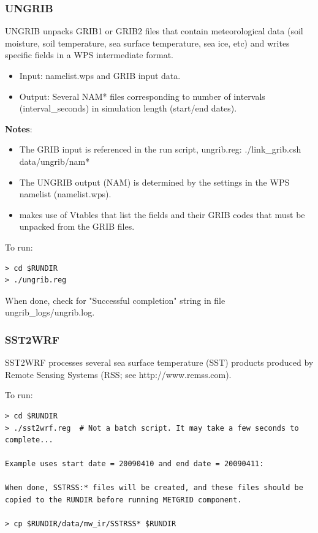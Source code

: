 \begin{frame}[fragile]\frametitle{UNGRIB}

\scriptsize{
UNGRIB unpacks GRIB1 or GRIB2 files that contain  meteorological data (soil moisture, soil temperature, sea surface temperature, sea ice, etc) and writes specific fields in a WPS intermediate format.
\begin{itemize}
\item Input: namelist.wps  and GRIB input data.
\item Output: Several NAM* files corresponding to number of intervals (interval\_seconds) in simulation length (start/end dates).
\end{itemize}}
\scriptsize{\textbf{Notes}: 
\begin{itemize}
\item The GRIB input is referenced in the run script, ungrib.reg:
      ./link\_grib.csh data/ungrib/nam*\\
\item The UNGRIB output (NAM) is determined by the settings in the WPS namelist (namelist.wps).
\item makes use of Vtables that list the fields and their GRIB codes that must be unpacked from the GRIB files.
\end{itemize}
}
\hrulefill\par
\scriptsize{To run:}
\verbatimfont{\scriptsize}%
\begin{verbatim}
> cd $RUNDIR
> ./ungrib.reg
\end{verbatim}
When done, check for "Successful completion" string in file ungrib\_logs/ungrib.log.

\end{frame}

\begin{frame}[fragile]
\frametitle{SST2WRF}

\footnotesize{
SST2WRF processes several sea surface temperature (SST) products produced by Remote Sensing Systems (RSS; see http://www.remss.com).\\
}    
\hrulefill\par
\footnotesize{To run:}
\begin{lstlisting}
> cd $RUNDIR
> ./sst2wrf.reg  # Not a batch script. It may take a few seconds to complete...

Example uses start date = 20090410 and end date = 20090411: 

When done, SSTRSS:* files will be created, and these files should be copied to the RUNDIR before running METGRID component. 

> cp $RUNDIR/data/mw_ir/SSTRSS* $RUNDIR
\end{lstlisting}

\end{frame}


